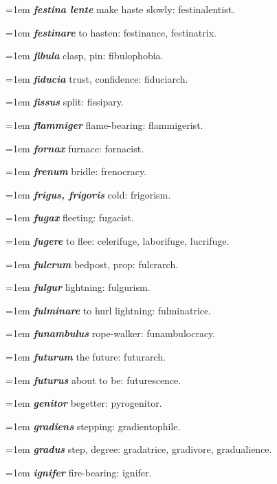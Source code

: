 \hangindent=1em \textbf{\textit{festina lente}} make haste slowly: festinalentist.\par
\hangindent=1em \textbf{\textit{festinare}} to hasten: festinance, festinatrix.\par
\hangindent=1em \textbf{\textit{fibula}} clasp, pin: fibulophobia.\par
\hangindent=1em \textbf{\textit{fiducia}} trust, confidence: fiduciarch.\par
\hangindent=1em \textbf{\textit{fissus}} split: fissipary.\par
\hangindent=1em \textbf{\textit{flammiger}} flame-bearing: flammigerist.\par
\hangindent=1em \textbf{\textit{fornax}} furnace: fornacist.\par
\hangindent=1em \textbf{\textit{frenum}} bridle: frenocracy.\par
\hangindent=1em \textbf{\textit{frigus, frigoris}} cold: frigorism.\par
\hangindent=1em \textbf{\textit{fugax}} fleeting: fugacist.\par
\hangindent=1em \textbf{\textit{fugere}} to flee: celerifuge, laborifuge, lucrifuge.\par
\hangindent=1em \textbf{\textit{fulcrum}} bedpost, prop: fulcrarch.\par
\hangindent=1em \textbf{\textit{fulgur}} lightning: fulgurism.\par
\hangindent=1em \textbf{\textit{fulminare}} to hurl lightning: fulminatrice.\par
\hangindent=1em \textbf{\textit{funambulus}} rope-walker: funambulocracy.\par
\hangindent=1em \textbf{\textit{futurum}} the future: futurarch.\par
\hangindent=1em \textbf{\textit{futurus}} about to be: futurescence.\par
\hangindent=1em \textbf{\textit{genitor}} begetter: pyrogenitor.\par
\hangindent=1em \textbf{\textit{gradiens}} stepping: gradientophile.\par
\hangindent=1em \textbf{\textit{gradus}} step, degree: gradatrice, gradivore, gradualience.\par
\hangindent=1em \textbf{\textit{ignifer}} fire-bearing: ignifer.\par
